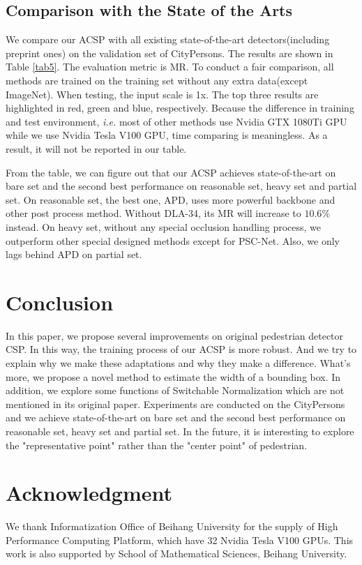 \documentclass[twocolumn]{article}
\begin{document}
\subsection{Comparison with the State of the Arts}
We compare our ACSP with all existing state-of-the-art detectors(including preprint ones) on the validation set of CityPersons. The results are shown in Table \ref{tab5}. The evaluation metric is MR. To conduct a fair comparison, all methods are trained on the training set without any extra data(except ImageNet). When testing, the input scale is 1x. The top three results are highlighted in red, green and blue, respectively. Because the difference in training and test environment, \textit{i.e.} most of other methods use Nvidia GTX 1080Ti GPU while we use Nvidia Tesla V100 GPU, time comparing is meaningless. As a result, it will not be reported in our table.\par 
From the table, we can figure out that our ACSP achieves state-of-the-art on bare set and the second best performance on reasonable set, heavy set and partial set. On reasonable set, the best one, APD\cite{DBLP:journals/corr/abs-1910-09188}, uses more powerful backbone and other post process method. Without DLA-34, its MR will increase to $10.6\%$ instead. On heavy set, without any special occlusion handling process, we outperform other special designed methods except for PSC-Net\cite{xie2020psc}. Also, we only lags behind APD\cite{DBLP:journals/corr/abs-1910-09188} on partial set.





\section{Conclusion}
In this paper, we propose several improvements on original pedestrian detector CSP\cite{liu2019high}. In this way, the training process of our ACSP is more robust. And we try to explain why we make these adaptations and why they make a difference. What's more, we propose a novel method to estimate the width of a bounding box. In addition, we explore some functions of Switchable Normalization which are not mentioned in its original paper\cite{luo2018differentiable}. Experiments are conducted  on the CityPersons\cite{zhang2017citypersons} and we achieve state-of-the-art on bare set and  the second best performance on reasonable set, heavy set and partial set. In the future, it is interesting to explore the "representative point" rather than the "center point" of pedestrian.


\section{Acknowledgment}
We thank Informatization Office of Beihang University for the supply of High Performance Computing Platform, which have 32 Nvidia Tesla V100 GPUs. This work is also supported by  School of Mathematical Sciences, Beihang University.


\end{document}
